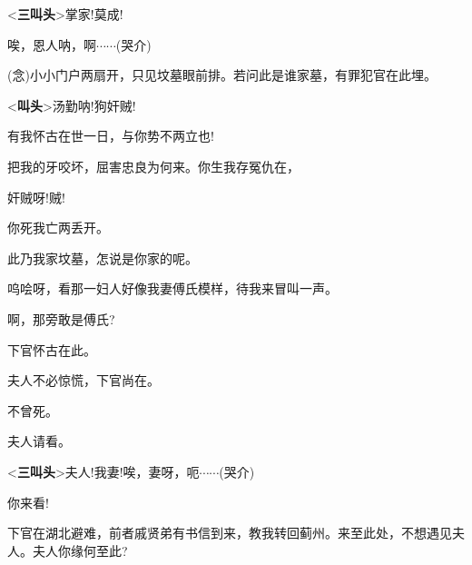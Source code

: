 {{\textless{}{\!\bfseries\akai 三叫头}\!\textgreater{}掌家!莫成!

唉，恩人呐，啊$\cdots{}\cdots{}$({\hwfs 哭}{\hwfs 介})}



{({\akai 念})小小门户两扇开，只见坟墓眼前排。若问此是谁家墓，有罪犯官在此埋。}

{\textless{}{\!\bfseries\akai 叫头}\!\textgreater{}汤勤呐!狗奸贼!}

{有我怀古在世一日，与你势不两立也!}

把我的牙咬坏，屈害忠良为何来。你生我存冤仇在，

{奸贼呀!贼!}\hspace{30pt}~

你死我亡两丢开。

{此乃我家坟墓，怎说是你家的呢。}

{呜哙呀，看那一妇人好像我妻傅氏模样，待我来冒叫一声。}

{啊，那旁敢是傅氏?}

{下官怀古在此。}\hspace{20pt}~

{夫人不必惊慌，下官尚在。}\hspace{10pt}~

{不曾死。}\hspace{30pt}~

{夫人请看。}\hspace{30pt}~

{\textless{}{\!\bfseries\akai 三叫头}\!\textgreater{}夫人!我妻!唉，妻呀，呃$\cdots{}\cdots{}$({\hwfs 哭}{\hwfs 介})}




{你来看!}\hspace{30pt}~


{下官在湖北避难，前者戚贤弟有书信到来，教我转回蓟州。来至此处，不想遇见夫人。夫人你缘何至此?}

}
